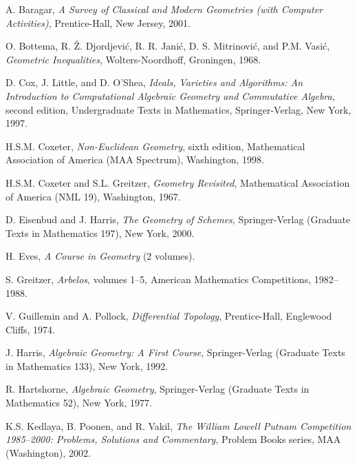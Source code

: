 \documentclass[12pt]{book}
\numberwithin{exc}{section}
\numberwithin{figure}{section}
\numberwithin{equation}{theorem}
\begin{document}
\begin{thebibliography}{99}

A. Baragar, \textit{A Survey of Classical and Modern Geometries
(with Computer Activities)}, Prentice-Hall, New Jersey, 2001.

O. Bottema, R. \v{Z}. Djordjevi\'c, R. R. Jani\'c, D. S. Mitrinovi\'c,
and P.M. Vasi\'c, \textit{Geometric Inequalities}, Wolters-Noordhoff,
Groningen, 1968.


D. Cox, J. Little, and D. O'Shea,
\textit{Ideals, Varieties and Algorithms: An Introduction to Computational
Algebraic Geometry and Commutative Algebra}, second edition,
Undergraduate Texts in Mathematics, Springer-Verlag, New York, 1997.

H.S.M. Coxeter, \textit{Non-Euclidean Geometry},
sixth edition, Mathematical Association of America
(MAA Spectrum), Washington, 1998.

H.S.M. Coxeter and S.L. Greitzer, \textit{Geometry Revisited},
Mathematical Association of America (NML 19), Washington, 1967.

D. Eisenbud and J. Harris, \textit{The Geometry of Schemes},
Springer-Verlag (Graduate Texts in Mathematics 197), New York, 2000.

H. Eves, \textit{A Course in Geometry} (2 volumes).

S. Greitzer, \textit{Arbelos}, volumes 1--5, American Mathematics
Competitions, 1982--1988.

V. Guillemin and A. Pollock, \textit{Differential Topology}, Prentice-Hall,
Englewood Cliffs, 1974.

J. Harris, \textit{Algebraic Geometry: A First Course}, 
Springer-Verlag (Graduate Texts in Mathematics 133), New York, 1992.

R. Hartshorne, \emph{Algebraic Geometry}, Springer-Verlag (Graduate Texts
in Mathematics 52), New York, 1977.

K.S. Kedlaya, B. Poonen, and R. Vakil, \textit{The William Lowell
Putnam Competition 1985--2000: Problems, Solutions and Commentary},
Problem Books series, MAA (Washington), 2002.


\end{thebibliography}
\end{document}
